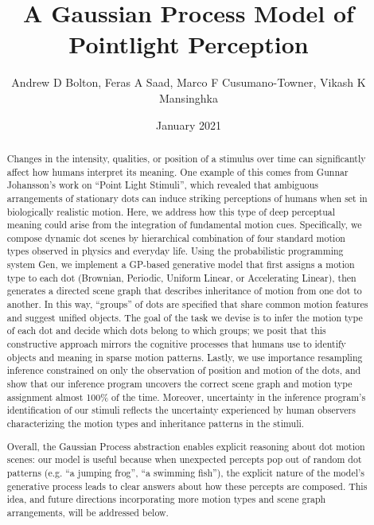 \documentclass{scrartcl}
\title{A Gaussian Process Model of Pointlight Perception}
\author{Andrew D Bolton, Feras A Saad, Marco F Cusumano-Towner, Vikash K Mansinghka}
\date{January 2021}
\begin{document}
\maketitle

\begin{abstract}
  Changes in the intensity, qualities, or position of a stimulus over time can significantly affect how humans interpret its meaning. One example of this comes from Gunnar Johansson's work on ``Point Light Stimuli'', which revealed that ambiguous arrangements of stationary dots can induce striking perceptions of humans when set in biologically realistic motion. Here, we address how this type of deep perceptual meaning could arise from the integration of fundamental motion cues. Specifically, we compose dynamic dot scenes by hierarchical combination of four standard motion types observed in physics and everyday life. Using the probabilistic programming system Gen, we implement a GP-based generative model that first assigns a motion type to each dot (Brownian, Periodic, Uniform Linear, or Accelerating Linear), then generates a directed scene graph that describes inheritance of motion from one dot to another. In this way, ``groups'' of dots are specified that share common motion features and suggest unified objects. The goal of the task we devise is to infer the motion type of each dot and decide which dots belong to which groups; we posit that this constructive approach mirrors the cognitive processes that humans use to identify objects and meaning in sparse motion patterns. Lastly, we use importance resampling inference constrained on only the observation of position and motion of the dots, and show that our inference program uncovers the correct scene graph and motion type assignment almost 100\% of the time. Moreover, uncertainty in the inference program's identification of our stimuli reflects the uncertainty experienced by human observers characterizing the motion types and inheritance patterns in the stimuli.

  Overall, the Gaussian Process abstraction enables explicit reasoning about dot motion scenes: our model is useful because when unexpected percepts pop out of random dot patterns (e.g. ``a jumping frog'', ``a swimming fish''), the explicit nature of the model's generative process leads to clear answers about how these percepts are composed. This idea, and future directions incorporating more motion types and scene graph arrangements, will be addressed below. 

\end{abstract}
\end{document}
